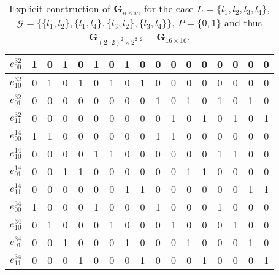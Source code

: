 \begin{table}[!ht]
\begin{tabular}{ r || c | c | c | c | c | c | c | c | c | c | c | c | c | c | c | c }
    $e^{32}_{00}$ & 1 & 0 & 1 & 0 & 1 & 0 & 1 & 0 & 0 & 0 & 0 & 0 & 0 & 0 & 0 & 0\\ \hline
    $e^{32}_{10}$ & 0 & 1 & 0 & 1 & 0 & 1 & 0 & 1 & 0 & 0 & 0 & 0 & 0 & 0 & 0 & 0\\ \hline
    $e^{32}_{01}$ & 0 & 0 & 0 & 0 & 0 & 0 & 0 & 0 & 1 & 0 & 1 & 0 & 1 & 0 & 1 & 0\\ \hline
    $e^{32}_{11}$ & 0 & 0 & 0 & 0 & 0 & 0 & 0 & 0 & 0 & 1 & 0 & 1 & 0 & 1 & 0 & 1\\ \hline

    $e^{14}_{00}$ & 1 & 1 & 0 & 0 & 0 & 0 & 0 & 0 & 1 & 1 & 0 & 0 & 0 & 0 & 0 & 0\\ \hline
    $e^{14}_{10}$ & 0 & 0 & 0 & 0 & 1 & 1 & 0 & 0 & 0 & 0 & 0 & 0 & 1 & 1 & 0 & 0\\ \hline
    $e^{14}_{01}$ & 0 & 0 & 1 & 1 & 0 & 0 & 0 & 0 & 0 & 0 & 1 & 1 & 0 & 0 & 0 & 0\\ \hline
    $e^{14}_{11}$ & 0 & 0 & 0 & 0 & 0 & 0 & 1 & 1 & 0 & 0 & 0 & 0 & 0 & 0 & 1 & 1\\ \hline

    $e^{34}_{00}$ & 1 & 0 & 0 & 0 & 1 & 0 & 0 & 0 & 1 & 0 & 0 & 0 & 1 & 0 & 0 & 0\\ \hline
    $e^{34}_{10}$ & 0 & 1 & 0 & 0 & 0 & 1 & 0 & 0 & 0 & 1 & 0 & 0 & 0 & 1 & 0 & 0\\ \hline
    $e^{34}_{01}$ & 0 & 0 & 1 & 0 & 0 & 0 & 1 & 0 & 0 & 0 & 1 & 0 & 0 & 0 & 1 & 0\\ \hline
    $e^{34}_{11}$ & 0 & 0 & 0 & 1 & 0 & 0 & 0 & 1 & 0 & 0 & 0 & 1 & 0 & 0 & 0 & 1\\
    \end{tabular}
\caption{Explicit construction of $\mathbf{G}_{n \times m}$ for the case $L = \{ l_1,l_2,l_3,l_4 \}$, $\mathcal{G} = \{\{l_1,l_2 \},\{l_1,l_4 \},\{l_3,l_2\},\{l_3,l_4\} \}$, $P=\{0,1\}$ and thus $\mathbf{G}_{(2 \cdot 2)^2 \times 2^{2 \cdot 2}} = \mathbf{G}_{16 \times 16}$.}
\label{tab:logmat222}
\end{table}
